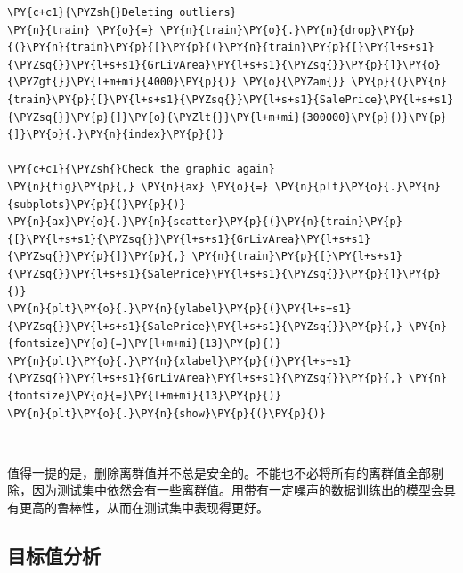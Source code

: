\documentclass[no-math]{YangThesis}
\begin{document}
\begin{tcolorbox}[breakable, size=fbox, boxrule=1pt, pad at break*=1mm,colback=cellbackground, colframe=cellborder]
	\begin{Verbatim}[commandchars=\\\{\}]
\PY{c+c1}{\PYZsh{}Deleting outliers}
\PY{n}{train} \PY{o}{=} \PY{n}{train}\PY{o}{.}\PY{n}{drop}\PY{p}{(}\PY{n}{train}\PY{p}{[}\PY{p}{(}\PY{n}{train}\PY{p}{[}\PY{l+s+s1}{\PYZsq{}}\PY{l+s+s1}{GrLivArea}\PY{l+s+s1}{\PYZsq{}}\PY{p}{]}\PY{o}{\PYZgt{}}\PY{l+m+mi}{4000}\PY{p}{)} \PY{o}{\PYZam{}} \PY{p}{(}\PY{n}{train}\PY{p}{[}\PY{l+s+s1}{\PYZsq{}}\PY{l+s+s1}{SalePrice}\PY{l+s+s1}{\PYZsq{}}\PY{p}{]}\PY{o}{\PYZlt{}}\PY{l+m+mi}{300000}\PY{p}{)}\PY{p}{]}\PY{o}{.}\PY{n}{index}\PY{p}{)}

\PY{c+c1}{\PYZsh{}Check the graphic again}
\PY{n}{fig}\PY{p}{,} \PY{n}{ax} \PY{o}{=} \PY{n}{plt}\PY{o}{.}\PY{n}{subplots}\PY{p}{(}\PY{p}{)}
\PY{n}{ax}\PY{o}{.}\PY{n}{scatter}\PY{p}{(}\PY{n}{train}\PY{p}{[}\PY{l+s+s1}{\PYZsq{}}\PY{l+s+s1}{GrLivArea}\PY{l+s+s1}{\PYZsq{}}\PY{p}{]}\PY{p}{,} \PY{n}{train}\PY{p}{[}\PY{l+s+s1}{\PYZsq{}}\PY{l+s+s1}{SalePrice}\PY{l+s+s1}{\PYZsq{}}\PY{p}{]}\PY{p}{)}
\PY{n}{plt}\PY{o}{.}\PY{n}{ylabel}\PY{p}{(}\PY{l+s+s1}{\PYZsq{}}\PY{l+s+s1}{SalePrice}\PY{l+s+s1}{\PYZsq{}}\PY{p}{,} \PY{n}{fontsize}\PY{o}{=}\PY{l+m+mi}{13}\PY{p}{)}
\PY{n}{plt}\PY{o}{.}\PY{n}{xlabel}\PY{p}{(}\PY{l+s+s1}{\PYZsq{}}\PY{l+s+s1}{GrLivArea}\PY{l+s+s1}{\PYZsq{}}\PY{p}{,} \PY{n}{fontsize}\PY{o}{=}\PY{l+m+mi}{13}\PY{p}{)}
\PY{n}{plt}\PY{o}{.}\PY{n}{show}\PY{p}{(}\PY{p}{)}
	\end{Verbatim}
\end{tcolorbox}

\begin{center}
\end{center}
{ \hspace*{\fill} \\}

值得一提的是，删除离群值并不总是安全的。不能也不必将所有的离群值全部剔除，因为测试集中依然会有一些离群值。用带有一定噪声的数据训练出的模型会具有更高的鲁棒性，从而在测试集中表现得更好。

\hypertarget{ux76eeux6807ux503cux5206ux6790}{%
	\subsection{目标值分析}\label{ux76eeux6807ux503cux5206ux6790}}
\end{document}
